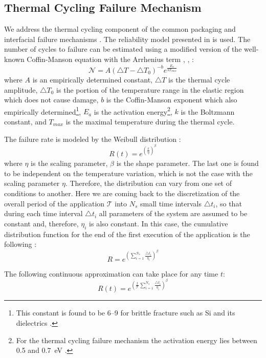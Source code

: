 \subsection{Thermal Cycling Failure Mechanism}
We address the thermal cycling component of the common packaging and interfacial failure mechanisms \cite{jedec2010}. The reliability model presented in \cite{xiang2010} is used. The number of cycles to failure can be estimated using a modified version of the well-known Coffin-Manson equation with the Arrhenius term \cite{jedec2010}, \cite{xiang2010}, \cite{ciappa2003}:
\begin{equation} \label{eq:cycles-to-failure}
  \mathcal{N} = A (\triangle T - \triangle T_0)^{-b} e^{\frac{E_a}{k T_{max}}}
\end{equation}
where $A$ is an empirically determined constant, $\triangle T$ is the thermal cycle amplitude, $\triangle T_0$ is the portion of the temperature range in the elastic region which does not cause damage, $b$ is the Coffin-Manson exponent which also empirically determined\footnote{This constant is found to be 6--9 for brittle fracture such as Si and its dielectrics \cite{jedec2010}.}, $E_{a}$ is the activation energy\footnote{For the thermal cycling failure mechanism the activation energy lies between 0.5 and 0.7~eV \cite{vigrass}.}, $k$ is the Boltzmann constant, and $T_{max}$ is the maximal temperature during the thermal cycle.

The failure rate is modeled by the Weibull distribution \cite{xiang2010}:
\[
  R(t) = e^{(\frac{t}{\eta})^\beta}
\]
where $\eta$ is the scaling parameter, $\beta$ is the shape parameter. The last one is found to be independent on the temperature variation, which is not the case with the scaling parameter $\eta$. Therefore, the distribution can vary from one set of conditions to another. Here we are coming back to the discretization of the overall period of the application $\mathcal{T}$ into $N_s$ small time intervals $\triangle t_i$, so that during each time interval $\triangle t_i$ all parameters of the system are assumed to be constant and, therefore, $\eta_i$ is also constant. In this case, the cumulative distribution function for the end of the first execution of the application is the following \cite{xiang2010}:
\[
  R = e^{(\sum_{i=1}^{N_s} \frac{\triangle t_i}{\eta_i})^\beta}
\]

The following continuous approximation can take place for any time $t$:
\[
  R(t) = e^{(\frac{t}{\mathcal{T}} \sum_{i=1}^{N_s} \frac{\triangle t_i}{\eta_i})^\beta}
\]

